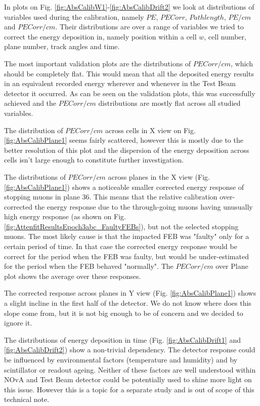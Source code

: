 In plots on Fig. \ref{fig:AbsCalibW1}-\ref{fig:AbsCalibDrift2} we look at distributions of variables used during the calibration, namely $PE$, $PECorr$, $Pathlength$, $PE/cm$ and $PECorr/cm$. Their distributions are over a range of variables we tried to correct the energy deposition in, namely position within a cell $w$, cell number, plane number, track angles and time.

The most important validation plots are the distributions of $PECorr/cm$, which should be completely flat. This would mean that all the deposited energy results in an equivalent recorded energy wherever and whenever in the Test Beam detector it occurred. As can be seen on the validation plots, this was successfully achieved and the $PECorr/cm$ distributions are mostly flat across all studied variables.

The distribution of $PECorr/cm$ across cells in X view on Fig. \ref{fig:AbsCalibPlane1} seems fairly scattered, however this is mostly due to the better resolution of this plot and the dispersion of the energy deposition across cells isn't large enough to constitute further investigation.

The distributions of $PECorr/cm$ across planes in the X view (Fig. \ref{fig:AbsCalibPlane1}) shows a noticeable smaller corrected energy response of stopping muons in plane 36. This means that the relative calibration over-corrected the energy response due to the through-going muons having unusually high energy response (as shown on Fig. \ref{fig:AttenfitResultsEpoch3abc_FaultyFEBs}), but not the selected stopping muons. The most likely cause is that the impacted FEB was "faulty" only for a certain period of time. In that case the corrected energy response would be correct for the period when the FEB was faulty, but would be under-estimated for the period when the FEB behaved "normally". The $PECorr/cm$ over Plane plot shows the average over these responses.

The corrected response across planes in Y view (Fig. \ref{fig:AbsCalibPlane1}) shows a slight incline in the first half of the detector. We do not know where does this slope come from, but it is not big enough to be of concern and we decided to ignore it.

The distributions of energy deposition in time (Fig. \ref{fig:AbsCalibDrift1} and \ref{fig:AbsCalibDrift2}) show a non-trivial dependency. The detector response could be influenced by environmental factors (temperature and humidity) and by scintillator or readout ageing. Neither of these factors are well understood within NOvA and Test Beam detector could be potentially used to shine more light on this issue. However this is a topic for a separate study and is out of scope of this technical note.

